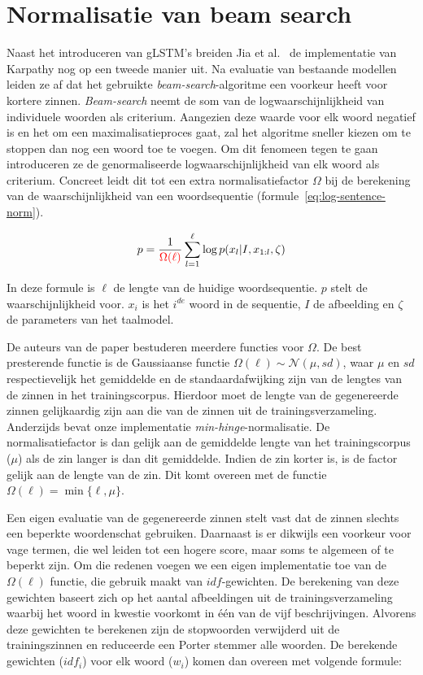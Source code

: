 \section{Normalisatie van beam search}
Naast het introduceren van gLSTM's breiden Jia et al.~\cite{Fernando2015} de implementatie van Karpathy nog op een tweede manier uit. Na evaluatie van bestaande modellen leiden ze af dat het gebruikte \emph{beam-search}-algoritme een voorkeur heeft voor kortere zinnen. \emph{Beam-search} neemt de som van de logwaarschijnlijkheid van individuele woorden als criterium. Aangezien deze waarde voor elk woord negatief is en het om een maximalisatieproces gaat, zal het algoritme sneller kiezen om te stoppen dan nog een woord toe te voegen. Om dit fenomeen tegen te gaan introduceren ze de genormaliseerde logwaarschijnlijkheid van elk woord als criterium. Concreet leidt dit tot een extra normalisatiefactor $\Omega$ bij de berekening van de waarschijnlijkheid van een woordsequentie (formule~\eqref{eq:log-sentence-norm}).

\begin{equation}
p = \frac{1}{\color{red}{\Omega(\ell)}}\sum_{l=1}^{\ell} \log p(x_l | I, x_{1:l}, \zeta)
\label{eq:log-sentence-norm}
\end{equation}

In deze formule is $\ell$ de lengte van de huidige woordsequentie. $p$ stelt de waarschijnlijkheid voor. $x_i$ is het $i^{de}$ woord in de sequentie, $I$ de afbeelding en $\zeta$ de parameters van het taalmodel. 

De auteurs van de paper bestuderen meerdere functies voor $\Omega$. 
De best presterende functie is de Gaussiaanse functie $\Omega(\ell) \sim \mathcal{N}(\mu, sd)$, waar $\mu$ en $sd$ respectievelijk het gemiddelde en de standaardafwijking zijn van de lengtes van de zinnen in het trainingscorpus. Hierdoor moet de lengte van de gegenereerde zinnen gelijkaardig zijn aan die van de zinnen uit de trainingsverzameling. 
Anderzijds bevat onze implementatie \emph{min-hinge}-normalisatie. De normalisatiefactor is dan gelijk aan de gemiddelde lengte van het trainingscorpus ($\mu$) als de zin langer is dan dit gemiddelde. Indien de zin korter is, is de factor gelijk aan de lengte van de zin. Dit komt overeen met de functie $\Omega(\ell)=\min\{\ell, \mu\}$.

Een eigen evaluatie van de gegenereerde zinnen stelt vast dat de zinnen slechts een beperkte woordenschat gebruiken. Daarnaast is er dikwijls een voorkeur voor vage termen, die wel leiden tot een hogere score, maar soms te algemeen of te beperkt zijn.
Om die redenen voegen we een eigen implementatie toe van de $\Omega(\ell)$ functie, die gebruik maakt van $idf$-gewichten. De berekening van deze gewichten baseert zich op het aantal afbeeldingen uit de trainingsverzameling waarbij het woord in kwestie voorkomt in \'e\'en van de vijf beschrijvingen. Alvorens deze gewichten te berekenen zijn de stopwoorden verwijderd uit de trainingszinnen en reduceerde een Porter stemmer alle woorden. De berekende gewichten ($idf_i$) voor elk woord ($w_i$) komen dan overeen met volgende formule: 


